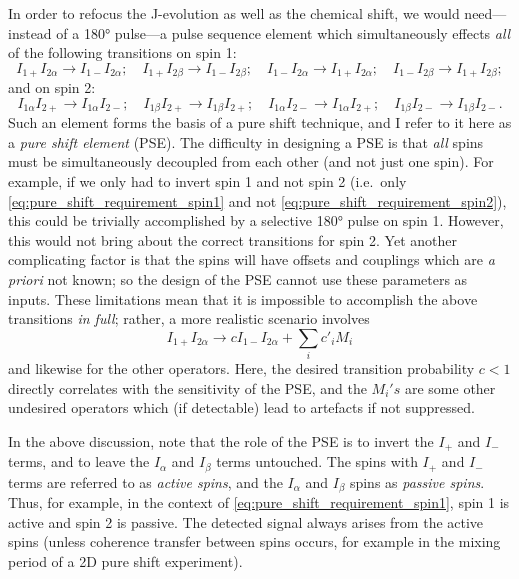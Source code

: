 In order to refocus the J-evolution as well as the chemical shift, we would need---instead of a \ang{180} pulse---a pulse sequence element which simultaneously effects \textit{all} of the following transitions on spin 1:
\begin{equation}
    \label{eq:pure_shift_requirement_spin1}
    I_{1+}I_{2\alpha} \longrightarrow I_{1-}I_{2\alpha}; \quad I_{1+}I_{2\beta} \longrightarrow I_{1-}I_{2\beta}; \quad
    I_{1-}I_{2\alpha} \longrightarrow I_{1+}I_{2\alpha}; \quad I_{1-}I_{2\beta} \longrightarrow I_{1+}I_{2\beta};
\end{equation}
and on spin 2:
\begin{equation}
    \label{eq:pure_shift_requirement_spin2}
    I_{1\alpha}I_{2+} \longrightarrow I_{1\alpha}I_{2-}; \quad I_{1\beta}I_{2+} \longrightarrow I_{1\beta}I_{2+}; \quad
    I_{1\alpha}I_{2-} \longrightarrow I_{1\alpha}I_{2+}; \quad I_{1\beta}I_{2-} \longrightarrow I_{1\beta}I_{2-}.
\end{equation}
Such an element forms the basis of a pure shift technique, and I refer to it here as a \textit{pure shift element} (PSE).
The difficulty in designing a PSE is that \textit{all} spins must be simultaneously decoupled from each other (and not just one spin).
For example, if we only had to invert spin 1 and not spin 2 (i.e.\ only \cref{eq:pure_shift_requirement_spin1} and not \cref{eq:pure_shift_requirement_spin2}), this could be trivially accomplished by a selective \ang{180} pulse on spin 1.
However, this would not bring about the correct transitions for spin 2.
Yet another complicating factor is that the spins will have offsets and couplings which are \textit{a priori} not known; so the design of the PSE cannot use these parameters as inputs.
These limitations mean that it is impossible to accomplish the above transitions \textit{in full}; rather, a more realistic scenario involves
\begin{equation}
    \label{eq:realistic_pse}
    I_{1+}I_{2\alpha} \longrightarrow c I_{1-}I_{2\alpha} + \sum_i c'_i M_i
\end{equation}
and likewise for the other operators.
Here, the desired transition probability $c < 1$ directly correlates with the sensitivity of the PSE, and the $M_i's$ are some other undesired operators which (if detectable) lead to artefacts if not suppressed.

In the above discussion, note that the role of the PSE is to invert the $I_+$ and $I_-$ terms, and to leave the $I_\alpha$ and $I_\beta$ terms untouched.
The spins with $I_+$ and $I_-$ terms are referred to as \textit{active spins}, and the $I_\alpha$ and $I_\beta$ spins as \textit{passive spins}.
Thus, for example, in the context of \cref{eq:pure_shift_requirement_spin1}, spin 1 is active and spin 2 is passive.
The detected signal always arises from the active spins (unless coherence transfer between spins occurs, for example in the mixing period of a 2D pure shift experiment).

